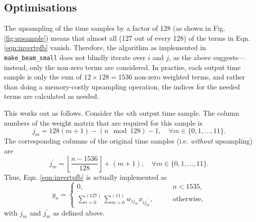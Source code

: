 \documentclass{article}
\begin{document}
\subsection{Optimisations}

The upsampling of the time samples by a factor of 128 (as shown in Fig. \ref{fig:upsample}) means that almost all (127 out of every 128) of the terms in Eqn. \eqref{eqn:invertpfb} vanish.
Therefore, the algorithm as implemented in \texttt{make\_beam\_small} does not blindly iterate over $i$ and $j$, as the above suggests---instead, only the non-zero terms are considered.
In practise, each output time sample is only the sum of $12 \times 128 = 1536$ non-zero weighted terms, and rather than doing a memory-costly upsampling operation, the indices for the needed terms are calculated as needed.

This works out as follows.
Consider the $n$th output time sample.
The column numbers of the weight matrix that are required for this sample is
\begin{equation}
    j_m = 128(m+1) - (n \mod 128) - 1, \quad \forall m \in \{0,1,\dots,11\}.
\end{equation}
The corresponding columns of the original time samples (i.e. \emph{without} upsampling) are
\begin{equation}
    j_m^\prime = \left\lfloor \frac{n - 1536}{128} \right\rfloor + (m+1), \quad \forall m \in \{0,1,\dots,11\}.
\end{equation}
Thus, Eqn. \eqref{eqn:invertpfb} is actually implemented as
\begin{equation}
    y_n = \begin{cases}
        0, &\qquad n < 1535, \\[5pt]
              \sum\limits_{i=0}^{(127)} \sum\limits_{m=0}^{(11)} w_{ij_m} x_{ij_m^\prime}, &\qquad \text{otherwise,}
          \end{cases}
    \label{eqn:invertpfb_optimised}
\end{equation}
with $j_m$ and $j^\prime_m$ as defined above.
\end{document}

